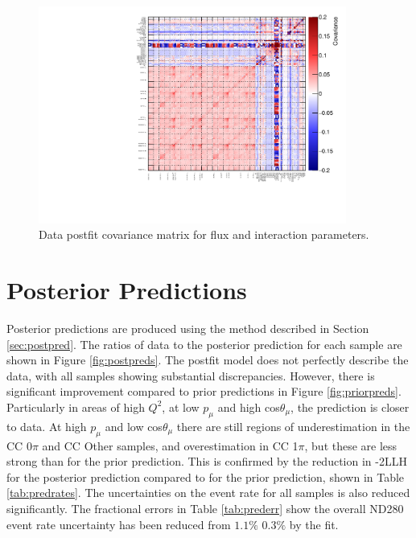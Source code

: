 \begin{figure}
\centering
\includegraphics*[width=0.9\textwidth,clip]{figs/datpostfitcov}
\caption{Data postfit covariance matrix for flux and interaction parameters.}\label{fig:datpostfitcov}
\end{figure}

\section{Posterior Predictions}\label{sec:respostpred}

Posterior predictions are produced using the method described in Section \ref{sec:postpred}. The ratios of data to the posterior prediction for each sample are shown in Figure \ref{fig:postpreds}. The postfit model does not perfectly describe the data, with all samples showing substantial discrepancies. However, there is significant improvement compared to prior predictions in Figure \ref{fig:priorpreds}. Particularly in areas of high $Q^2$, at low $p_{\mu}$ and high cos$\theta_{\mu}$, the prediction is closer to data. At high $p_{\mu}$ and low cos$\theta_{\mu}$ there are still regions of underestimation in the CC 0$\pi$ and CC Other samples, and overestimation in CC 1$\pi$, but these are less strong than for the prior prediction. This is confirmed by the reduction in -2LLH for the posterior prediction compared to for the prior prediction, shown in Table \ref{tab:predrates}. The uncertainties on the event rate for all samples is also reduced significantly. The fractional errors in Table \ref{tab:prederr} show the overall ND280 event rate uncertainty has been reduced from $1.1\%$ $0.3\%$ by the fit.

